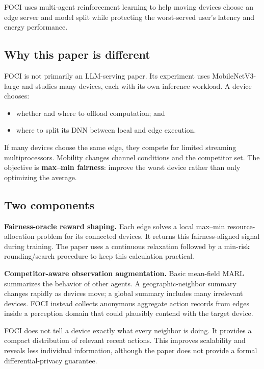 \documentclass[10pt,a4paper]{article}
\newcommand{\term}[1]{\textbf{\color{navy}#1}}
\begin{document}
\begin{takeaway}
FOCI uses multi-agent reinforcement learning to help moving devices choose an edge server and model split while protecting the worst-served user's latency and energy performance.
\end{takeaway}

\subsection{Why this paper is different}

FOCI is not primarily an LLM-serving paper. Its experiment uses MobileNetV3-large and studies many devices, each with its own inference workload. A device chooses:
\begin{itemize}
  \item whether and where to offload computation; and
  \item where to split its DNN between local and edge execution.
\end{itemize}

If many devices choose the same edge, they compete for limited streaming multiprocessors. Mobility changes channel conditions and the competitor set. The objective is \term{max--min fairness}: improve the worst device rather than only optimizing the average.

\subsection{Two components}

\textbf{Fairness-oracle reward shaping.} Each edge solves a local max--min resource-allocation problem for its connected devices. It returns this fairness-aligned signal during training. The paper uses a continuous relaxation followed by a min-risk rounding/search procedure to keep this calculation practical.

\textbf{Competitor-aware observation augmentation.} Basic mean-field MARL summarizes the behavior of other agents. A geographic-neighbor summary changes rapidly as devices move; a global summary includes many irrelevant devices. FOCI instead collects anonymous aggregate action records from edges inside a perception domain that could plausibly contend with the target device.

\begin{plainbox}
FOCI does not tell a device exactly what every neighbor is doing. It provides a compact distribution of relevant recent actions. This improves scalability and reveals less individual information, although the paper does not provide a formal differential-privacy guarantee.
\end{plainbox}
\end{document}
